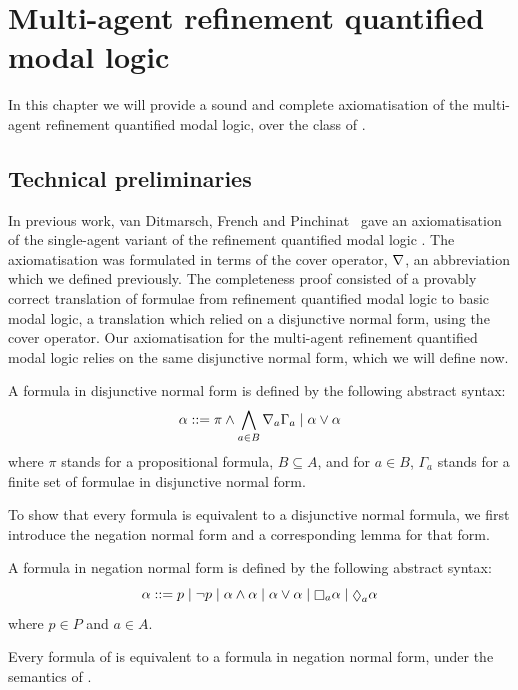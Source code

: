 \chapter{Multi-agent refinement quantified modal logic}\label{k}

In this chapter we will provide a sound and complete axiomatisation of the
multi-agent refinement quantified modal logic, over the class of \classK{}. 

\section{Technical preliminaries}

In previous work, van Ditmarsch, French and Pinchinat~\cite{french2010future}
gave an axiomatisation of the single-agent variant of the refinement quantified
modal logic \logicKF{}.  The axiomatisation was formulated in terms of the cover
operator, $\nabla$, an abbreviation which we defined previously. The
completeness proof consisted of a provably correct translation of formulae from
refinement quantified modal logic to basic modal logic, a translation which
relied on a disjunctive normal form, using the cover operator. Our
axiomatisation for the multi-agent refinement quantified modal logic relies on
the same disjunctive normal form, which we will define now.

\begin{definition}
A formula in disjunctive normal form is defined by the following abstract syntax:
$$
\alpha ::= \pi \land \bigwedge_{a \in B} \nabla_a \Gamma_a \mid \alpha \lor \alpha
$$
where $\pi$ stands for a propositional formula, $B \subseteq A$, and for $a \in
B$, $\Gamma_a$ stands for a finite set of formulae in disjunctive normal form.
\end{definition}

To show that every \lang{} formula is equivalent to a disjunctive normal
formula, we first introduce the negation normal form and a corresponding lemma
for that form.

\begin{definition}
A formula in negation normal form is defined by the following abstract syntax:
$$
\alpha ::= p \bnfalt 
\neg p \bnfalt
\alpha \land \alpha \bnfalt
\alpha \lor \alpha \bnfalt
\knows_a \alpha \bnfalt
\suspects_a \alpha
$$
where $p \in P$ and $a \in A$.
\end{definition}

\begin{lemma}\label{k-nnf}
Every formula of \lang{} is equivalent to a formula in negation normal form,
under the semantics of \logicK{}.
\end{lemma}

